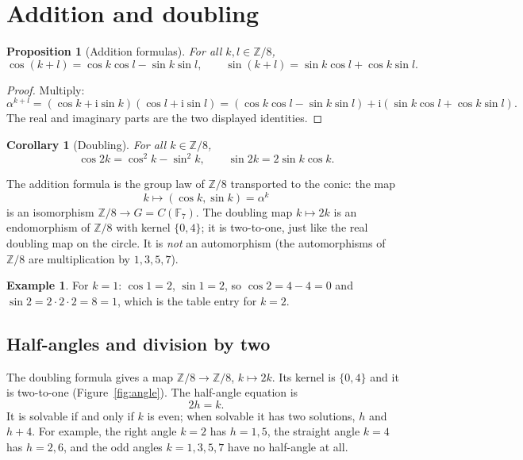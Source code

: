 \documentclass[11pt]{article}
\newtheorem{proposition}[theorem]{Proposition}
\newtheorem{corollary}[theorem]{Corollary}
\theoremstyle{definition}
\newtheorem{example}[theorem]{Example}
\theoremstyle{remark}
\newcommand{\F}{\mathbb{F}}
\newcommand{\Z}{\mathbb{Z}}
\newcommand{\ii}{\mathrm{i}}
\begin{document}
\section{Addition and doubling}
\label{sec:addition}

\begin{proposition}[Addition formulas]\label{prop:addition}
For all $k,l\in\Z/8$,
\[
  \cos(k+l)=\cos k\cos l-\sin k\sin l,\qquad
  \sin(k+l)=\sin k\cos l+\cos k\sin l .
\]
\end{proposition}

\begin{proof}
Multiply:
\[
  \alpha^{k+l}
  =(\cos k+\ii\sin k)(\cos l+\ii\sin l)
  =(\cos k\cos l-\sin k\sin l)
   +\ii(\sin k\cos l+\cos k\sin l).
\]
The real and imaginary parts are the two displayed identities.
\end{proof}

\begin{corollary}[Doubling]\label{cor:doubling}
For all $k\in\Z/8$,
\[
  \cos 2k=\cos^2 k-\sin^2 k,\qquad
  \sin 2k=2\sin k\cos k .
\]
\end{corollary}

The addition formula is the group law of $\Z/8$ transported to the conic: the
map
\[
  k\longmapsto(\cos k,\sin k)=\alpha^k
\]
is an isomorphism $\Z/8\to G=C(\F_7)$.  The doubling map $k\mapsto2k$ is an
endomorphism of $\Z/8$ with kernel $\{0,4\}$; it is two-to-one, just like the
real doubling map on the circle.  It is \emph{not} an automorphism (the
automorphisms of $\Z/8$ are multiplication by $1,3,5,7$).

\begin{example}
For $k=1$: $\cos1=2$, $\sin1=2$, so $\cos2=4-4=0$ and
$\sin2=2\cdot2\cdot2=8=1$, which is the table entry for $k=2$.
\end{example}

\subsection{Half-angles and division by two}
\label{subsec:half-angle}

The doubling formula gives a map $\Z/8\to\Z/8$, $k\mapsto2k$.  Its kernel is
$\{0,4\}$ and it is two-to-one (Figure~\ref{fig:angle}).  The half-angle
equation is
\[
  2h=k .
\]
It is solvable if and only if $k$ is even; when solvable it has two solutions,
$h$ and $h+4$.  For example, the right angle $k=2$ has $h=1,5$, the straight
angle $k=4$ has $h=2,6$, and the odd angles $k=1,3,5,7$ have no half-angle at
all.
\end{document}

